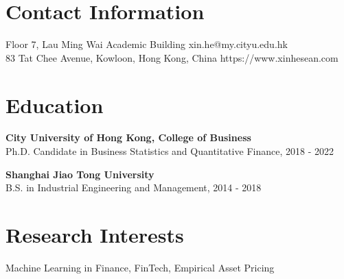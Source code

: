 \documentclass[margin]{res}
\begin{document}
	\begin{resume}
		
		
		
		
		\section{\sc Contact Information}
		Floor 7, Lau Ming Wai Academic Building	   \hfill xin.he@my.cityu.edu.hk\\        
		83 Tat Chee Avenue, Kowloon, Hong Kong, China 	\hfill   https://www.xinhesean.com \\
		
		\vspace{5mm}
		
		\section{\sc Education}
		\textbf{City University of Hong Kong, College of Business}\\
		{Ph.D. Candidate in Business Statistics and Quantitative Finance, 2018 - 2022}
		
		\textbf{Shanghai Jiao Tong University}\\
		{B.S. in Industrial Engineering and Management, 2014 - 2018}
		
		\vspace{5mm}
		
		\section{\sc Research Interests}
		{Machine Learning in Finance, FinTech, Empirical Asset Pricing}
		

\end{resume}
\end{document}
